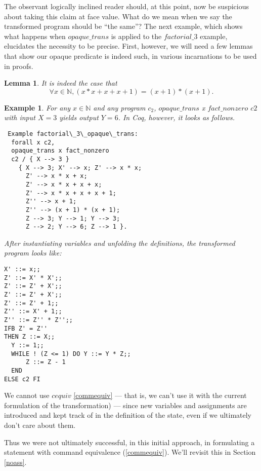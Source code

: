 \documentclass[compsoc,conference,a4paper,10pt,times]{IEEEtran}
\newtheorem{lemma}[theorem]{Lemma}
\newtheorem{example}[theorem]{Example}
\begin{document}
\par The observant logically inclined reader should, at this point, now be suspicious about taking this claim at face value.  What do we mean when we say the transformed program should be ``the same''?  The next example, which shows what happens when $opaque\_trans$ is applied to the $factorial\_3$ example, elucidates the necessity to be precise.  First, however, we will need a few lemmas that show our opaque predicate is indeed such, in various incarnations to be used in proofs.

\begin{lemma}\label{opaqueness}
    It is indeed the case that 
    \[ \forall x \in \mathbb{N}, 
	(x * x + x + x + 1) = (x + 1) * (x + 1).  \] 
\end{lemma}

\begin{example}\label{firstfact}
    For any $x\in \mathbb{N}$ and any program $c_2$, $opaque\_trans$ x $fact\_nonzero$ $c2$ with input $X=3$ yields output $Y=6$.  In Coq, however, it looks as follows.
    \begin{verbatim} Example factorial\_3\_opaque\_trans:
  forall x c2, 
  opaque_trans x fact_nonzero 
  c2 / { X --> 3 } 
    { X --> 3; X' --> x; Z' --> x * x; 
      Z' --> x * x + x; 
      Z' --> x * x + x + x;
      Z' --> x * x + x + x + 1; 
      Z'' --> x + 1; 
      Z'' --> (x + 1) * (x + 1); 
      Z --> 3; Y --> 1; Y --> 3; 
      Z --> 2; Y --> 6; Z --> 1 }.
    \end{verbatim}
      After instantiating variables and unfolding the definitions, the transformed program looks like:
      \begin{verbatim}
X' ::= x;;
Z' ::= X' * X';;
Z' ::= Z' + X';;
Z' ::= Z' + X';;
Z' ::= Z' + 1;;
Z'' ::= X' + 1;;
Z'' ::= Z'' * Z'';;
IFB Z' = Z''
THEN Z ::= X;;
  Y ::= 1;;
  WHILE ! (Z <= 1) DO Y ::= Y * Z;; 
      Z ::= Z - 1 
  END
ELSE c2 FI
      \end{verbatim}
\end{example}
      
\par We cannot use $cequiv$ \eqref{commequiv} --- that is, we can't use it with the current formulation of the transformation) --- since new variables and assignments are introduced and kept track of in the definition of the state, even if we ultimately don't care about them.  
\par Thus we were not ultimately successful, in this initial approach, in formulating a statement with command equivalence (\ref{commequiv}).  We'll revisit this in Section \ref{noass}.
\end{document}
